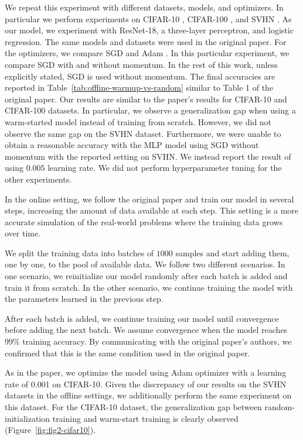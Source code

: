 We repeat this experiment with different datasets, models, and optimizers. In particular we perform experiments on CIFAR-10 \cite{hinton_learning_2007}, CIFAR-100 \cite{hinton_learning_2007}, and SVHN \cite{svhn}. As our model, we experiment with ResNet-18, a three-layer perceptron, and logistic regression. The same models and datasets were used in the original paper. For the optimizers, we compare SGD \cite{rumelhart_learning_1986} and Adam \cite{kingma_adam:_2015}. In this particular experiment, we compare SGD with and without momentum. In the rest of this work, unless explicitly stated, SGD is used without momentum. 
The final accuracies are reported in Table~\ref{tab:offline-warmup-vs-random} similar to Table 1 of the original paper. Our results are similar to the paper's results for CIFAR-10 and CIFAR-100 datasets. In particular, we observe a generalization gap when using a warm-started model instead of training from scratch. However, we did not observe the same gap on the SVHN dataset.  Furthermore, we were unable to obtain a reasonable accuracy with the MLP model using SGD without momentum with the reported setting on SVHN. We instead report the result of using $0.005$ learning rate. We did not perform hyperparameter tuning for the other experiments.

%




In the online setting, we follow the original paper and train our model in several steps, increasing the amount of data available at each step. This setting is a more accurate simulation of the real-world problems where the training data grows over time. 
%

%

We split the training data into batches of $1000$ samples and start adding them, one by one, to the pool of available data. We follow two different scenarios. In one scenario, we reinitialize our model randomly after each batch is added and train it from scratch. In the other scenario, we continue training the model with the parameters learned in the previous step. 


After each batch is added, we continue training our model until convergence before adding the next batch. We assume convergence when the model reaches 99\% training accuracy. By communicating with the original paper's authors, we confirmed that this is the same condition used in the original paper.


%
%
%
%
%
%
%

%


As in the paper, we optimize the model using Adam optimizer with a learning rate of 0.001 on CIFAR-10. Given the discrepancy of our results on the SVHN datasets in the offline settings, we additionally perform the same experiment on this dataset. For the CIFAR-10 dataset, the generalization gap between random-initialization training and warm-start training is clearly observed (Figure~\ref{fig:fig2-cifar10}). 

